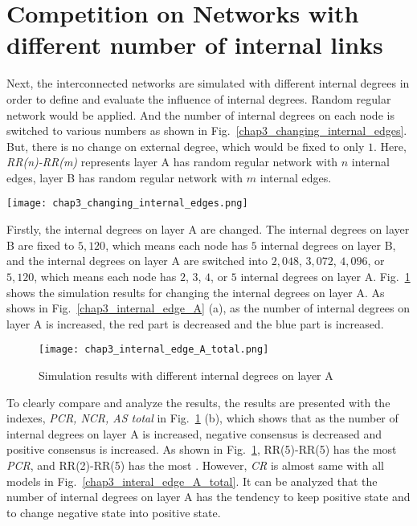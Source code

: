 \section{Competition on Networks with different number of internal links}
Next, the interconnected networks are simulated with different internal degrees in order to define and evaluate the influence of internal degrees. Random regular network would be applied. And the number of internal degrees on each node is switched to various numbers as shown in Fig.~\ref{chap3_changing_internal_edges}. But, there is no change on external degree, which would be fixed to only $1$. Here, \textit{RR(n)-RR(m)} represents layer A has random regular network with $n$ internal edges, layer B has random regular network with $m$ internal edges.
\begin{figure*}[!htb]
	\centering
	\texttt{[image: chap3\_changing\_internal\_edges.png]}
	\caption{Competition on interconnected networks with different internal edges}
	\label{chap3_changing_internal_edges}
\end{figure*}
Firstly, the internal degrees on layer A are changed. The internal degrees on layer B are fixed to $5,120$, which means each node has $5$ internal degrees on layer B, and the internal degrees on layer A are switched into $2,048$, $3,072$, $4,096$, or $5,120$, which means each node has $2$, $3$, $4$, or $5$ internal degrees on layer A. Fig.~\ref{chap3_internal_edge_A_total} shows the simulation results for changing the internal degrees on layer A. As shows in Fig.~\ref{chap3_internal_edge_A} (a), as the number of internal degrees on layer A is increased, the red part is decreased and the blue part is increased.  
   
\begin{figure}[!htb]
	\centering
	\texttt{[image: chap3\_internal\_edge\_A\_total.png]}
	\caption{Simulation results with different internal degrees on layer A}
	\label{chap3_internal_edge_A_total}
\end{figure}

To clearly compare and analyze the results, the results are presented with the indexes, \textit{PCR, NCR, AS total} in Fig.~\ref{chap3_internal_edge_A_total} (b), which shows that as the number of internal degrees on layer A is increased, negative consensus is decreased and positive consensus is increased. As shown in Fig.~\ref{chap3_internal_edge_A_total}, RR(5)-RR(5) has the most \textit{PCR}, and RR(2)-RR(5) has the most . However, \textit{CR} is almost same with all models in Fig.~\ref{chap3_interal_edge_A_total}. It can be analyzed that the number of internal degrees on layer A has the tendency to keep positive state and to change negative state into positive state. 

